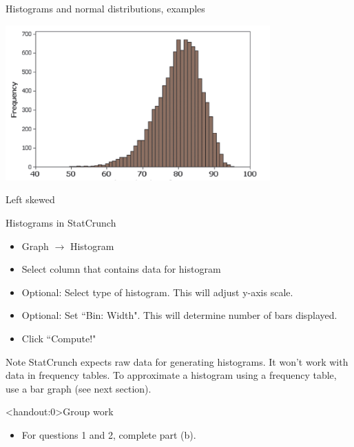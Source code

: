 \documentclass[]{beamer}
\begin{document}
\begin{frame}{Histograms and normal distributions, examples}

{\centering
\includegraphics[width=4in]{../images/ch02_hist_lskew}
\par}
\bigskip
\pause
\begin{block}{}
\centering \large Left skewed
\end{block}
\end{frame}

\begin{frame}{Histograms in StatCrunch}
\begin{block}{}
\begin{itemize}
\item Graph $\to$ Histogram
\item Select column that contains data for histogram
\item Optional: Select type of histogram. This will adjust y-axis scale.
\item Optional: Set ``Bin: Width". This will determine number of bars displayed.
\item Click ``Compute!"
\end{itemize}
\end{block}

\begin{alertblock}{Note}
StatCrunch expects raw data for generating histograms. It won't work with data in frequency tables. To approximate a histogram using a frequency table, use a bar graph (see next section).
\end{alertblock}
\end{frame}

\begin{frame}<handout:0>{Group work}
\begin{block}{}
\large
\begin{itemize}
\item For questions 1 and 2, complete part (b).
\end{itemize}
\end{block}
\end{frame}
\end{document}
